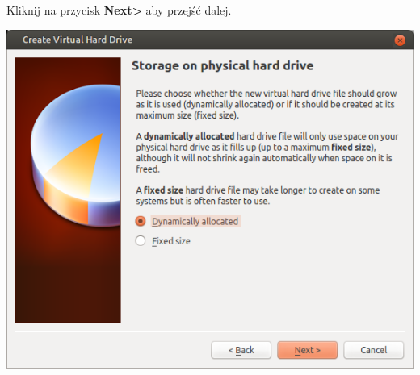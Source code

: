 \begin{flushright}
Kliknij na przycisk \textbf{Next\textgreater} aby przejść dalej.
\end{flushright}
\clearpage
\twocolumn
\noindent\includegraphics[scale=0.7]{images/virtualbox_wizard5.png}

